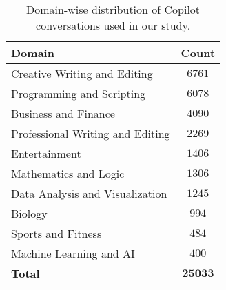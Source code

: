 \begin{table}[ht!]
\centering
\small 
\begin{tabular}{l c}
\toprule
\textbf{Domain} & \textbf{Count} \\
\midrule
Creative Writing and Editing & $6761$ \\
Programming and Scripting & $6078$ \\
Business and Finance & $4090$ \\
Professional Writing and Editing & $2269$ \\
Entertainment & $1406$ \\
Mathematics and Logic & $1306$ \\
Data Analysis and Visualization & $1245$ \\
Biology & $994$ \\
Sports and Fitness & $484$ \\
Machine Learning and AI & $400$ \\
\midrule
\textbf{Total} & $\textbf{25033}$ \\
\bottomrule
\end{tabular}
\caption{Domain-wise distribution of Copilot conversations used in our study.}
\label{tab:domain_counts}
\end{table}
